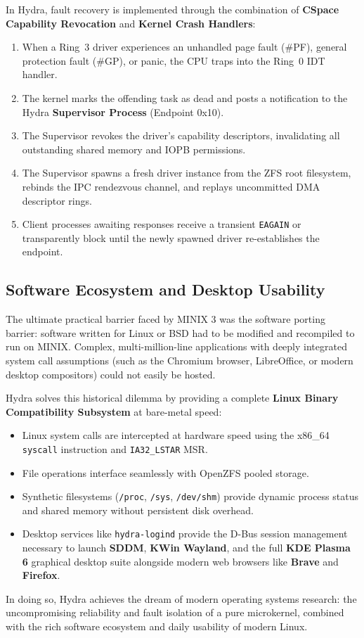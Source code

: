 In Hydra, fault recovery is implemented through the combination of \textbf{CSpace Capability Revocation} and \textbf{Kernel Crash Handlers}:
\begin{enumerate}
    \item When a Ring~3 driver experiences an unhandled page fault (\#PF), general protection fault (\#GP), or panic, the CPU traps into the Ring~0 IDT handler.
    \item The kernel marks the offending task as dead and posts a notification to the Hydra \textbf{Supervisor Process} (Endpoint 0x10).
    \item The Supervisor revokes the driver's capability descriptors, invalidating all outstanding shared memory and IOPB permissions.
    \item The Supervisor spawns a fresh driver instance from the ZFS root filesystem, rebinds the IPC rendezvous channel, and replays uncommitted DMA descriptor rings.
    \item Client processes awaiting responses receive a transient \texttt{EAGAIN} or transparently block until the newly spawned driver re-establishes the endpoint.
\end{enumerate}

\subsection{Software Ecosystem and Desktop Usability}
The ultimate practical barrier faced by MINIX 3 was the software porting barrier: software written for Linux or BSD had to be modified and recompiled to run on MINIX. Complex, multi-million-line applications with deeply integrated system call assumptions (such as the Chromium browser, LibreOffice, or modern desktop compositors) could not easily be hosted.

Hydra solves this historical dilemma by providing a complete \textbf{Linux Binary Compatibility Subsystem} at bare-metal speed:
\begin{itemize}
    \item Linux system calls are intercepted at hardware speed using the x86\_64 \texttt{syscall} instruction and \texttt{IA32\_LSTAR} MSR.
    \item File operations interface seamlessly with OpenZFS pooled storage.
    \item Synthetic filesystems (\texttt{/proc}, \texttt{/sys}, \texttt{/dev/shm}) provide dynamic process status and shared memory without persistent disk overhead.
    \item Desktop services like \texttt{hydra-logind} provide the D-Bus session management necessary to launch \textbf{SDDM}, \textbf{KWin Wayland}, and the full \textbf{KDE Plasma 6} graphical desktop suite alongside modern web browsers like \textbf{Brave} and \textbf{Firefox}.
\end{itemize}
In doing so, Hydra achieves the dream of modern operating systems research: the uncompromising reliability and fault isolation of a pure microkernel, combined with the rich software ecosystem and daily usability of modern Linux.
